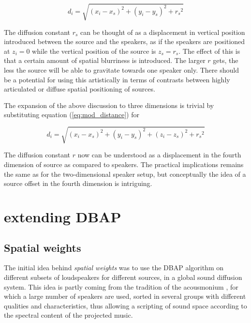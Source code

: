 \documentclass[twoside,10pt]{article}
\begin{document}
\begin{equation} \label{eq:mod_distance}
d_{i} = \sqrt{ {(x_{i} - x_{s})}^2 + {(y_{i} - y_{s})}^2 + {r_{s}}^2}
\end{equation}

The diffusion constant $r_{s}$ can be thought of as a displacement in vertical position introduced between the source and the speakers, as if the speakers are positioned at $z_{i}=0$ while the vertical position of the source is $z_{s}=r_{s}$. The effect of this is that a certain amount of spatial blurriness is introduced. The larger $r$ gets, the less the source will be able to gravitate towards one speaker only. There should be a potential for using this artistically in terms of contrasts between highly articulated or diffuse spatial positioning of sources.

The expansion of the above discussion to three dimensions is trivial by substituting equation (\ref{eq:mod_distance}) for

\begin{equation} \label{eq:3D_mod_distance}
d_{i} = \sqrt{ {(x_{i} - x_{s})}^2 + {(y_{i} - y_{s})}^2 + {(z_{i} - z_{s})}^2 + {r_{s}}^2}
\end{equation}

The diffusion constant $r$ now can be understood as a displacement in the fourth dimension of source as compared to speakers. The practical implications remains the same as for the two-dimensional speaker setup, but conceptually the idea of a source offset in the fourth dimension is intriguing.

%
%

\section{extending DBAP}

\subsection{Spatial weights}

The initial idea behind \textit{spatial weights} was to use the DBAP algorithm on different subsets of loudspeakers for different sources, in a global sound diffusion system. This idea is partly coming from the tradition of the acousmonium \cite{Bayle:1993MusiqueAcousmatique}, for which a large number of speakers are used, sorted in several groups with different qualities and characteristics, thus allowing a scripting of sound space according to the spectral content of the projected music\cite{Prager:2002acousmatique}.
\end{document}
